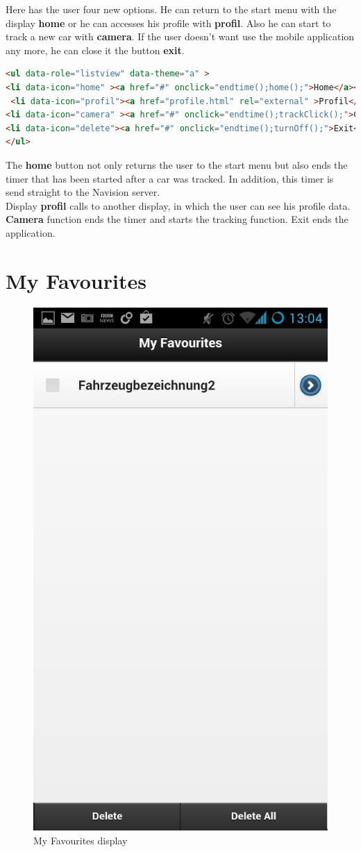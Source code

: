 Here has the user four new options. He can return to the start menu with the display \textbf{home} or he can accesses his profile with \textbf{profil}. Also he can start to track a new car with \textbf{camera}. If the user doesn't want use the mobile application any more, he can close it the button \textbf{exit}. 
\\
\begin{lstlisting}[language=html, caption=Source code of slide panel options,captionpos=b]
<ul data-role="listview" data-theme="a" >
<li data-icon="home" ><a href="#" onclick="endtime();home();">Home</a></li>
 <li data-icon="profil"><a href="profile.html" rel="external" >Profil</a></li>
<li data-icon="camera" ><a href="#" onclick="endtime();trackClick();">Camera</a></li>
<li data-icon="delete"><a href="#" onclick="endtime();turnOff();">Exit</a></li>
</ul>
\end{lstlisting}

The \textbf{home} button not only returns the user to the start menu but also ends the timer that has been started after a car was tracked. In addition, this timer is send straight to the Navision server.  
\\

Display \textbf{profil} calls to another display, in which the user can see his profile data. 
\textbf{Camera} function ends the timer and starts the tracking function. Exit ends the application.

\section{My Favourites}
\begin{figure}[h]
\centering
\includegraphics[width=0.4\linewidth]{graphics/chapter4/15}
\caption{My Favourites display}
\label{fig:16}
\end{figure}

